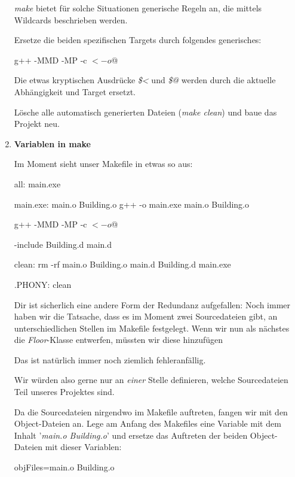 \documentclass[
  accentcolor=tud1c,	%
  colorbacktitle,		%
  inverttitle,			%
  german,				%
  twoside
]{tudexercise}
\begin{document}
\begin{enumerate}
\emph{make} bietet für solche Situationen generische Regeln an, die mittels Wildcards beschrieben werden.

Ersetze die beiden spezifischen Targets durch folgendes generisches:
\begin{lstmake}
	g++ -MMD -MP -c $< -o $@
\end{lstmake}
Die etwas kryptischen Ausdrücke \emph{\$<} und \emph{\$@} werden durch die aktuelle Abhängigkeit und Target ersetzt.

Lösche alle automatisch generierten Dateien (\emph{make clean}) und baue das Projekt neu.





\item\textbf{Variablen in make}

Im Moment sieht unser Makefile in etwas so aus:
\begin{lstmake}
all: main.exe

main.exe: main.o Building.o
	g++ -o main.exe main.o Building.o

	g++ -MMD -MP -c $< -o $@

-include Building.d main.d

clean:
	rm -rf main.o Building.o main.d Building.d main.exe
	
.PHONY: clean
\end{lstmake}

Dir ist sicherlich eine andere Form der Redundanz aufgefallen:
Noch immer haben wir die Tatsache, dass es im Moment zwei Sourcedateien gibt, an unterschiedlichen Stellen im Makefile festgelegt.
Wenn wir nun als nächstes die \emph{Floor}-Klasse entwerfen, müssten wir diese hinzufügen
Das ist natürlich immer noch ziemlich fehleranfällig.

Wir würden also gerne nur an \emph{einer} Stelle definieren, welche Sourcedateien Teil unseres Projektes sind.

Da die Sourcedateien nirgendwo im Makefile auftreten, fangen wir mit den Object-Dateien an.
Lege am Anfang des Makefiles eine Variable mit dem Inhalt '\emph{main.o Building.o}' und ersetze das Auftreten der beiden Object-Dateien mit dieser Variablen:
\begin{lstmake}
objFiles=main.o Building.o


\end{lstmake}
\end{enumerate}
\end{document}

